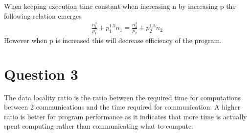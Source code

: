 \documentclass{article}
\begin{document}
When keeping execution time constant when increasing n by increasing p the following relation emerges
\begin{align}
\frac{n_1^3}{p_1}+p_1^{1.5}n_1 = \frac{n_2^3}{p_2}+p_2^{1.5}n_2
\end{align}
However when p is increased this will decrease efficiency of the program.

\section{Question 3}
The data locality ratio is the ratio between the required time for computations between 2 communications and the time required for communication. A higher ratio is better for program performance as it indicates that more time is actually spent computing rather than communicating what to compute.
\end{document}
